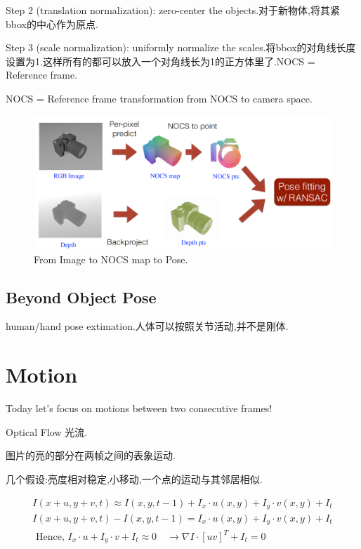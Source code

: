 	Step 2 (translation normalization): zero-center the objects.对于新物体,将其紧bbox的中心作为原点.
	
	Step 3 (scale normalization): uniformly normalize the scales.将bbox的对角线长度设置为1.这样所有的都可以放入一个对角线长为1的正方体里了.NOCS = Reference frame.
	
	NOCS = Reference frame transformation from NOCS to camera space.
	
	\begin{figure}[htbp]
		\centering
		\includegraphics[scale=0.65]{figures/image_nocs_pose.png}
		\caption{From Image to NOCS map to Pose.}
		\label{}
	\end{figure}

	\subsection{Beyond Object Pose}
	human/hand pose extimation.人体可以按照关节活动,并不是刚体.
	
	\clearpage
	\section{Motion}
	Today let’s focus on motions between two consecutive frames!
	
	Optical Flow 光流.
	
	图片的亮的部分在两帧之间的表象运动.
	
	几个假设:亮度相对稳定,小移动,一个点的运动与其邻居相似.
	
	\begin{equation}
		\begin{array}{l}
			I(x+u, y+v, t) \approx I(x, y, t-1)+I_{x} \cdot u(x, y)+I_{y} \cdot v(x, y)+I_{t} \\
			I(x+u, y+v, t)-I(x, y, t-1)=I_{x} \cdot u(x, y)+I_{y} \cdot v(x, y)+I_{t} \\
			\text { Hence, } I_{x} \cdot u+I_{y} \cdot v+I_{t} \approx 0 \quad \rightarrow \nabla I \cdot[u v]^{T}+I_{t}=0
		\end{array}
	\end{equation}


